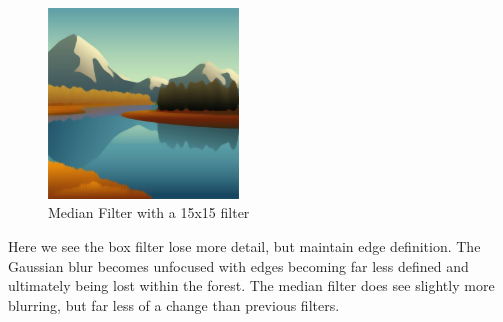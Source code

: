 \documentclass{article}
\begin{document}
\begin{figure}[H]
    \centering
    \includegraphics[width = 0.45\textwidth]{imgs/3x_median_artwork.jpg}
    \caption{Median Filter with a 15x15 filter}
    \label{fig:3x_median}
\end{figure}

Here we see the box filter lose more detail, but maintain edge definition. The Gaussian blur becomes unfocused with edges becoming far less defined and ultimately being lost within the forest. The median filter does see slightly more blurring, but far less of a change than previous filters.
\end{document}
